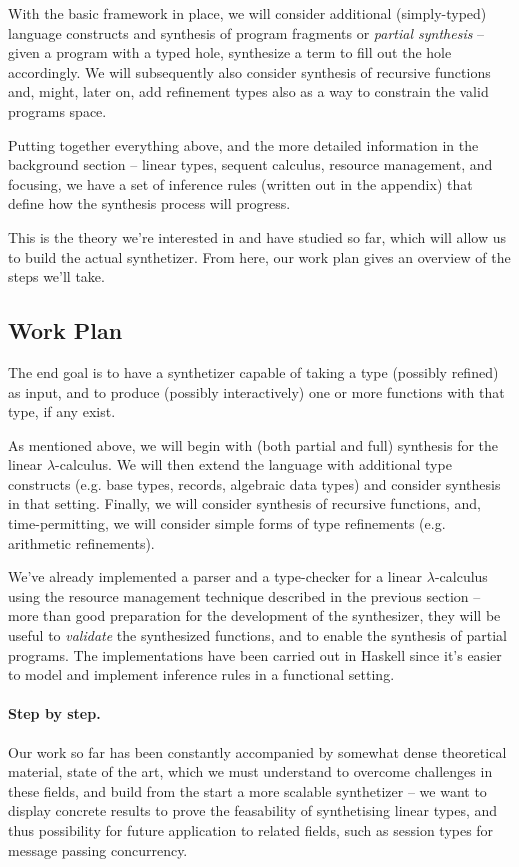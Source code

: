 \documentclass{llncs}
\newcommand{\mypara}[1]{\paragraph{\textbf{#1}.}}
\begin{document}
With the basic framework in place, we will consider additional
(simply-typed) language constructs and synthesis of program fragments
or \emph{partial synthesis} -- given a program with a typed hole,
synthesize a term to fill out the hole accordingly. We will
subsequently also consider synthesis of recursive functions and,
might, later on, add refinement types also as a way to constrain the
valid programs space.

Putting together everything above, and the more detailed information
in the background section -- linear types, sequent calculus, resource
management, and focusing, we have a set of inference rules (written
out in the appendix) that define how the synthesis process will
progress.

This is the theory we're interested in and have studied so far,
which will allow us to build the actual synthetizer. From here,
our work plan gives an overview of the steps we'll take.

\subsection{Work Plan}

The end goal is to have a synthetizer capable of
taking a type (possibly refined) as input, and to produce (possibly
interactively) one or more functions with that type, if any exist.

As mentioned above, we will begin with (both partial and full)
synthesis for the linear $\lambda$-calculus. We will then extend the
language with additional type constructs (e.g. base types, records,
algebraic data types) and consider synthesis in that setting. Finally,
we will consider synthesis of recursive functions, and,
time-permitting, we will consider simple forms of type refinements
(e.g. arithmetic refinements).

We've already implemented a parser and a type-checker for a linear
$\lambda$-calculus using the resource management technique described
in the previous section -- more than
good preparation for the development of the synthesizer, they will be
useful to \emph{validate} the synthesized functions, and to enable
the synthesis of partial programs.
%
The implementations have been carried out in Haskell since it's easier
to model and implement inference rules in a functional setting.

\mypara{Step by step} Our work so far has been constantly accompanied
by somewhat dense theoretical material, state of the art,
which we must understand to overcome challenges in these fields,
and build from the start a more scalable synthetizer -- we want
to display concrete results to prove the feasability of synthetising
linear types, and thus possibility for future application to related fields,
such as session types for message passing concurrency.
\end{document}
